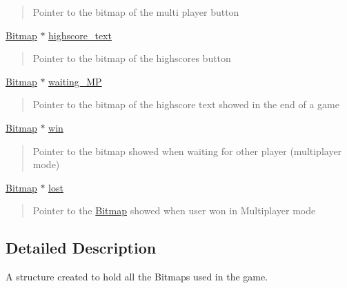 \begin{DoxyCompactItemize}
\begin{DoxyCompactList}
\begin{quote}
Pointer to the bitmap of the multi player button \end{quote}
\end{DoxyCompactList}\item 
\hyperlink{struct_bitmap}{Bitmap} $\ast$ \hyperlink{struct_b_m_ps_holder__t_a363b4830dc5cd37d23062b81c64d1903}{highscore\+\_\+text}
\begin{DoxyCompactList}\small\item\em \begin{quote}
Pointer to the bitmap of the highscores button \end{quote}
\end{DoxyCompactList}\item 
\hyperlink{struct_bitmap}{Bitmap} $\ast$ \hyperlink{struct_b_m_ps_holder__t_ac67fdbe89e0f655e44d4445901fb5692}{waiting\+\_\+\+MP}
\begin{DoxyCompactList}\small\item\em \begin{quote}
Pointer to the bitmap of the highscore text showed in the end of a game \end{quote}
\end{DoxyCompactList}\item 
\hyperlink{struct_bitmap}{Bitmap} $\ast$ \hyperlink{struct_b_m_ps_holder__t_a4eee83abbb2345c4be67f06fac361d94}{win}
\begin{DoxyCompactList}\small\item\em \begin{quote}
Pointer to the bitmap showed when waiting for other player (multiplayer mode) \end{quote}
\end{DoxyCompactList}\item 
\hyperlink{struct_bitmap}{Bitmap} $\ast$ \hyperlink{struct_b_m_ps_holder__t_a45ecec1d2762f2fd9f9ccc6ffc0cdbf6}{lost}
\begin{DoxyCompactList}\small\item\em \begin{quote}
Pointer to the \hyperlink{struct_bitmap}{Bitmap} showed when user won in Multiplayer mode \end{quote}
\end{DoxyCompactList}\end{DoxyCompactItemize}


\subsection{Detailed Description}
A structure created to hold all the Bitmaps used in the game. 

